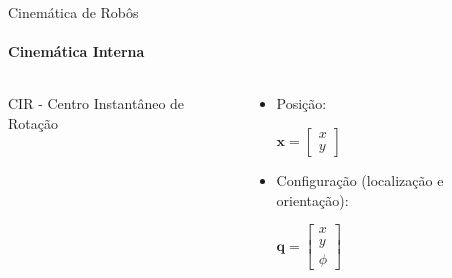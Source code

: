 \documentclass[aspectratio=169]{beamer}
\begin{document}
\begin{frame}{Cinemática de Robôs}
    \framesubtitle{Cinemática Interna}
    \begin{columns}
        \begin{column}[c]{0.5\textwidth}
            \centering
            
        CIR - Centro Instantâneo de Rotação
        \end{column}
        \begin{column}[c]{0.5\textwidth}
            \centering
            \begin{itemize}
                \item Posição:
                      \newline

                      $\mathbf{x} = \begin{bmatrix}
                              x \\
                              y
                          \end{bmatrix}$
                      \newline

                \item Configuração (localização e orientação):
                      \newline

                      $\mathbf{q} =
                          \begin{bmatrix}
                              x \\
                              y \\
                              \phi
                          \end{bmatrix}$
            \end{itemize}
        \end{column}
    \end{columns}
\end{frame}
\end{document}
